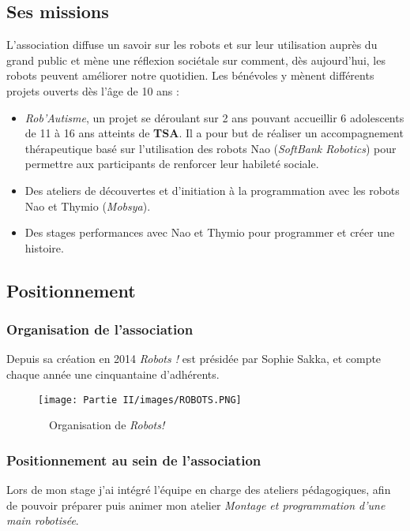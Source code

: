 \newpage

\subsection{Ses missions}
L'association diffuse un savoir sur les robots et sur leur utilisation auprès du grand public et mène une réflexion sociétale sur comment, dès aujourd'hui, les robots peuvent améliorer notre quotidien. Les bénévoles y mènent différents projets ouverts dès l'âge de 10 ans :

\begin{itemize}
    \item \textit{Rob'Autisme}, un projet se déroulant sur 2 ans pouvant accueillir 6 adolescents de 11 à 16 ans atteints de \textbf{TSA}. Il a pour but de réaliser un accompagnement thérapeutique basé sur l'utilisation des robots Nao (\textit{SoftBank Robotics}) pour permettre aux participants de renforcer leur habileté sociale.
    \item Des ateliers de découvertes et d'initiation à la programmation avec les robots Nao et Thymio (\textit{Mobsya}).
    \item Des stages performances avec Nao et Thymio pour programmer et créer une histoire.
\end{itemize}


\subsection{Positionnement}

\subsubsection{Organisation de l'association}
Depuis sa création en 2014 \textit{Robots !} est présidée par Sophie Sakka, et compte chaque année une cinquantaine d'adhérents.
\begin{figure}[!h]
    \centering
    \texttt{[image: Partie II/images/ROBOTS.PNG]}
    \caption{\, \, Organisation de \textit{Robots!}}
    \label{fig_3.1.0.1}
\end{figure}

\newpage

\subsubsection{Positionnement au sein de l'association}
Lors de mon stage j'ai intégré l'équipe en charge des ateliers pédagogiques, afin de pouvoir préparer puis animer mon atelier \textit{Montage et programmation d'une main robotisée}.

